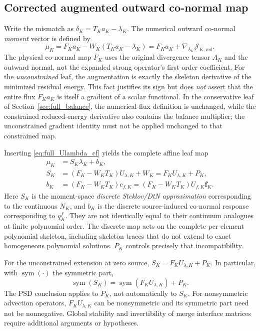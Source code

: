 \documentclass[11pt]{article}
\begin{document}
\subsection{Corrected augmented outward co-normal map}
\label{sec:full_augmented}
Write the mismatch as $\delta_K=T_Ka_K-\lambda_K$.
The numerical outward co-normal \emph{moment} vector is defined by
\begin{equation}\label{eq:full_mu}
 \boxed{\displaystyle
 \mu_K=F_Ka_K-W_K(T_Ka_K-\lambda_K)
 =F_Ka_K+\nabla_{\lambda_K}\mathcal J_{K,\mathrm{red}}.}
\end{equation}
The physical co-normal map $F_K$ uses the original divergence tensor
$A_K$ and the outward normal, not the expanded strong operator's
first-order coefficient.  For the \emph{unconstrained} leaf, the augmentation is exactly the
skeleton derivative of the minimized residual energy.  This fact
justifies its sign but does \emph{not} assert that the entire flux
$F_Ka_K$ is itself a gradient of a scalar functional.  In the
conservative leaf of Section~\ref{sec:full_balance}, the numerical-flux
definition is unchanged, while the constrained reduced-energy derivative
also contains the balance multiplier; the unconstrained gradient identity
must not be applied unchanged to that constrained map.

Inserting \eqref{eq:full_Ulambda_cf} yields the complete affine leaf map
\begin{equation}\label{eq:full_leaf_Sb}
 \boxed{\begin{aligned}
 \mu_K&=S_K\lambda_K+b_K,\\[-1mm]
 S_K&=(F_K-W_KT_K)U_{\lambda,K}+W_K
      =F_KU_{\lambda,K}+P_K,\\
 b_K&=(F_K-W_KT_K)c_{f,K}
      =(F_K-W_KT_K)U_{f,K}\bm f_K.
 \end{aligned}}
\end{equation}
Here $S_K$ is the moment-space \emph{discrete Steklov/DtN
approximation} corresponding to the continuous $N_K$, and $b_K$ is
the discrete source-induced co-normal response corresponding to
$q_K^f$.  They are not identically equal to their continuum analogues
at finite polynomial order.  The discrete map acts on the complete
per-element polynomial skeleton, including skeleton traces that do not
extend to exact homogeneous polynomial solutions.  $P_K$ controls
precisely that incompatibility.

For the unconstrained extension at zero source,
$S_K=F_KU_{\lambda,K}+P_K$.  In particular,
with $\operatorname{sym}(\cdot)$ the symmetric part,
\begin{equation}\label{eq:full_Ssym}
 \operatorname{sym}(S_K)
 =\operatorname{sym}(F_KU_{\lambda,K})+P_K.
\end{equation}
The PSD conclusion applies to $P_K$, not automatically to $S_K$.
For nonsymmetric advection operators, $F_KU_{\lambda,K}$ can be
nonsymmetric and its symmetric part need not be nonnegative.  Global
stability and invertibility of merge interface matrices require
additional arguments or hypotheses.
\end{document}
